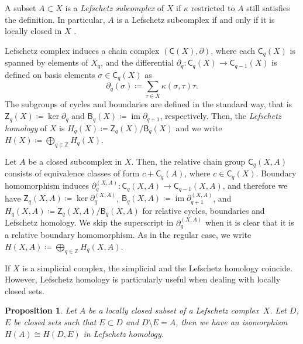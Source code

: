 \documentclass[letterpaper,11pt]{article}
\theoremstyle{plain}
\newtheorem{proposition}[theorem]{Proposition}
\theoremstyle{definition}
\newcommand{\im}{\operatorname{im}}
\newcounter{li}
\newcommand{\inc}{\kappa}
\newcommand{\Zgroup}{\mathsf{Z}}
\newcommand{\Bgroup}{\mathsf{B}}
\newcommand{\Cgroup}{\mathsf{C}}
\begin{document}
A subset $A\subset X$ is a \emph{Lefschetz subcomplex} of $X$ if $\kappa$ restricted to $A$ still satisfies the definition. 
In particular, $A$ is a Lefschetz subcomplex if and only if it is locally closed in $X$ \cite[Theorem~3.1]{MroBat2009}.

Lefschetz complex induces a chain complex $(\Cgroup(X),\partial)$, where each $\Cgroup_q(X)$ is spanned by elements of $X_q$, 
    and the differential $\partial_q:\Cgroup_q(X) \rightarrow \Cgroup_{q-1}(X)$ is defined on basis elements $\sigma\in \Cgroup_q(X)$ as
    \begin{equation}\label{eq:boundary_homomorphism}
        \partial_q(\sigma) \coloneqq \sum_{\tau\in X} \inc(\sigma, \tau) \tau.
    \end{equation}
The subgroups of cycles and boundaries are defined in the standard way, that is $\Zgroup_q(X)\coloneqq\ker\partial_q$ and $\Bgroup_q(X)\coloneqq\im\partial_{q+1}$, respectively.
Then, the \emph{Lefschetz homology} of $X$ is $H_q(X)\coloneqq \Zgroup_q(X)/\Bgroup_q(X)$
and we write $H(X)\coloneqq\bigoplus_{q\in\mathbb{Z}}H_q(X)$.

Let $A$ be a closed subcomplex in $X$.
Then, the relative chain group $\Cgroup_q(X,A)$ consists of equivalence classes of form $c+\Cgroup_q(A)$, where $c\in\Cgroup_q(X)$.
Boundary homomorphism
    induces     $\partial_q^{(X,A)}:\Cgroup_q(X,A)\rightarrow\Cgroup_{q-1}(X,A)$, 
        and therefore we have 
        $\Zgroup_q(X,A)\coloneqq\ker\partial_q^{(X,A)}$, 
        $\Bgroup_q(X,A)\coloneqq\im\partial_{q+1}^{(X,A)}$, 
        and $H_q(X,A)\coloneqq \Zgroup_q(X,A)/\Bgroup_q(X,A)$ for relative cycles, boundaries and Lefschetz homology.
We skip the superscript in $\partial_q^{(X,A)}$ when it is clear that it is a relative boundary homomorphism.
As in the regular case, we write $H(X,A)\coloneqq\bigoplus_{q\in\mathbb{Z}}H_q(X,A)$.

If $X$ is a simplicial complex, the simplicial and the Lefschetz homology coincide. 
However, Lefschetz homology is particularly useful when dealing with locally closed sets.
\begin{proposition}\cite[Proposition~3.5.8]{MroWan2025}\label{prop:lefschetz_relative_homology}
    Let $A$ be a locally closed subset of a Lefschetz complex~$X$.
    Let $D$, $E$ be closed sets such that $E\subset D$ and $D\setminus E=A$, then
    we have an isomorphism $H(A)\cong H(D, E)$ in Lefschetz homology.
    \label{prop:lefschetzhom}
\end{proposition}
\end{document}
